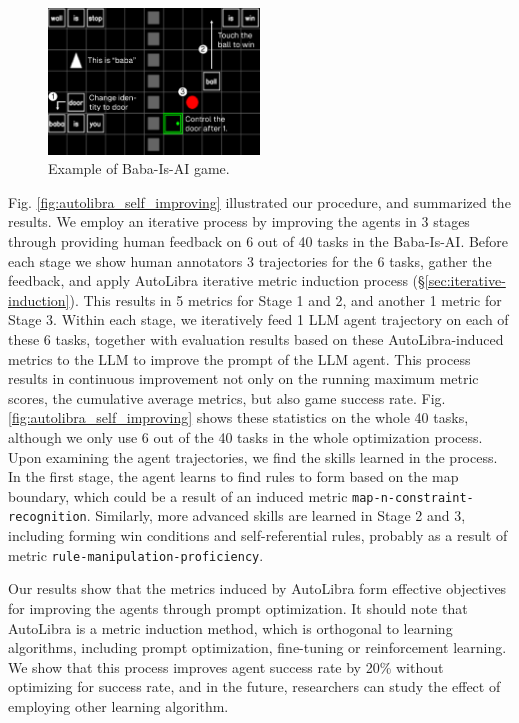 \documentclass[../main.tex]{subfiles}
\begin{document}
\begin{figure}[!t]
\centering
\includegraphics[width=0.5\textwidth]{figs/babaisai-self-referential.pdf}
\caption{Example of Baba-Is-AI game.}
\label{fig:baba-is-ai}
\end{figure}


Fig. \ref{fig:autolibra_self_improving} illustrated our procedure, and
summarized the results. We employ an iterative process by improving the agents in
3 stages through providing human feedback on 6 out of 40 tasks in the Baba-Is-AI.
Before each stage we show human annotators 3 trajectories for the 6 tasks, gather
the feedback, and apply AutoLibra iterative metric induction process (\S\ref{sec:iterative-induction}).
This results in 5 metrics for Stage 1 and 2, and another 1 metric for Stage 3. Within
each stage, we iteratively feed 1 LLM agent trajectory on each of these 6 tasks,
together with evaluation results based on these AutoLibra-induced metrics to the
LLM to improve the prompt of the LLM agent. This process results in continuous
improvement not only on the running maximum metric scores, the cumulative average
metrics, but also game success rate. Fig. \ref{fig:autolibra_self_improving}
shows these statistics on the whole 40 tasks, although we only use 6 out of the 40
tasks in the whole optimization process. Upon examining the agent trajectories, we
find the skills learned in the process. In the first stage, the agent learns to find
rules to form based on the map boundary, which could be a result of an induced
metric \texttt{map-n-constraint-recognition}. Similarly, more advanced skills are
learned in Stage 2 and 3, including forming win conditions and self-referential
rules, probably as a result of metric \texttt{rule-manipulation-proficiency}.

Our results show that the metrics induced by AutoLibra form effective objectives
for improving the agents through prompt optimization. It should note that AutoLibra
is a metric induction method, which is orthogonal to learning algorithms, including
prompt optimization, fine-tuning or reinforcement learning. We show that this process
improves agent success rate by 20\% without optimizing for success rate, and in the
future, researchers can study the effect of employing other learning algorithm.
\end{document}
